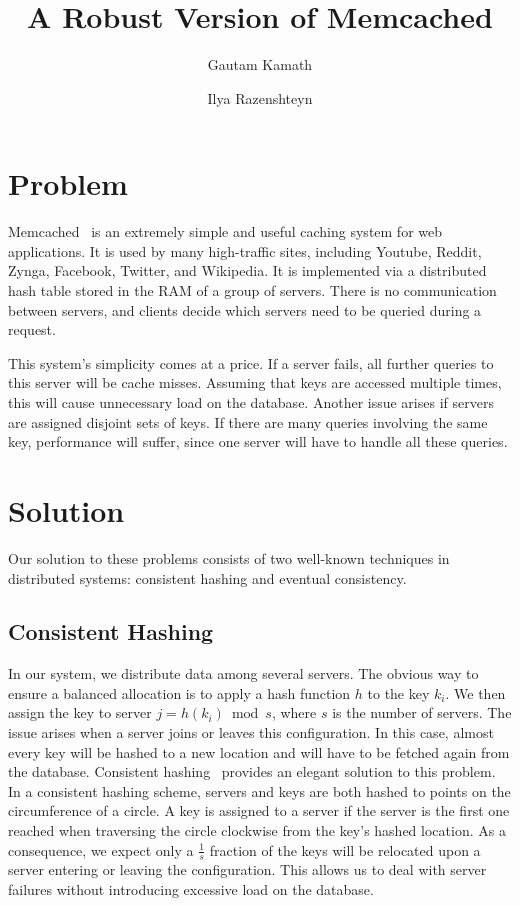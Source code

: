 \documentclass[letterpaper,8pt]{article}
\begin{document}
    \title{A Robust Version of Memcached}
    \author{Gautam Kamath \and Ilya Razenshteyn}
    \date{\vspace{-5em}}
    \maketitle

    \section{Problem}
     Memcached~\cite{memcached} is an extremely simple and useful caching system for web applications.
     It is used by many high-traffic sites, including Youtube, Reddit, Zynga, Facebook, Twitter, and Wikipedia.
     It is implemented via a distributed hash table stored in the RAM of a group of servers.
     There is no communication between servers, and clients decide which servers need to be queried during a request.

     This system's simplicity comes at a price.
     If a server fails, all further queries to this server will be cache misses.
     Assuming that keys are accessed multiple times, this will cause unnecessary load on the database.
     Another issue arises if servers are assigned disjoint sets of keys.
     If there are many queries involving the same key, performance will suffer, since one server will have to handle all these queries.
     \section{Solution}
     Our solution to these problems consists of two well-known techniques in distributed systems: consistent hashing and eventual consistency.
     \subsection{Consistent Hashing}
     In our system, we distribute data among several servers.
     The obvious way to ensure a balanced allocation is to apply a hash function $h$ to the key $k_i$.
     We then assign the key to server $j = h(k_i) \bmod s$, where $s$ is the number of servers.
     The issue arises when a server joins or leaves this configuration.
     In this case, almost every key will be hashed to a new location and will have to be fetched again from the database.
     Consistent hashing~\cite{chashing} provides an elegant solution to this problem.
     In a consistent hashing scheme, servers and keys are both hashed to points on the circumference of a circle.
     A key is assigned to a server if the server is the first one reached when traversing the circle clockwise from the key's hashed location.
     As a consequence, we expect only a $\frac{1}{s}$ fraction of the keys will be relocated upon a server entering or leaving the configuration.
     This allows us to deal with server failures without introducing excessive load on the database.
\end{document}
